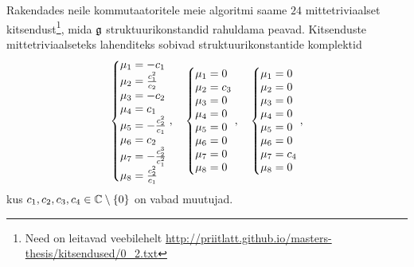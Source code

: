 Rakendades neile kommutaatoritele meie algoritmi saame $24$
mittetriviaalset kitsendust\footnote{Need on leitavad veebilehelt
\url{http://priitlatt.github.io/masters-thesis/kitsendused/0_2.txt}},
mida $\mathfrak{g}$ struktuurikonstandid rahuldama peavad. Kitsenduste
mittetriviaalseteks lahenditeks sobivad struktuurikonstantide komplektid
\renewcommand\arraystretch{1.3}
\begin{align*}
    \left\{ \begin{matrix*}[l]
        \m_1 = -c_1 \\
        \m_2 = \frac{c_1^2}{c_2} \\
        \m_3 = -c_2 \\
        \m_4 = c_1 \\
        \m_5 = -\frac{c_2^2}{c_1} \\
        \m_6 = c_2 \\
        \m_7 = -\frac{c_2^3}{c_1^2} \\
        \m_8 = \frac{c_2^2}{c_1} \\
    \end{matrix*} \right.,
    \quad
    \left\{ \begin{matrix*}[l]
        \m_1 = 0 \\
        \m_2 = c_3 \\
        \m_3 = 0 \\
        \m_4 = 0 \\
        \m_5 = 0 \\
        \m_6 = 0 \\
        \m_7 = 0 \\
        \m_8 = 0 \\
    \end{matrix*} \right.,
    \quad
    \left\{ \begin{matrix*}[l]
        \m_1 = 0 \\
        \m_2 = 0 \\
        \m_3 = 0 \\
        \m_4 = 0 \\
        \m_5 = 0 \\
        \m_6 = 0 \\
        \m_7 = c_4 \\
        \m_8 = 0 \\
    \end{matrix*} \right.,
\end{align*}
\renewcommand\arraystretch{1}
kus $c_1, c_2, c_3, c_4 \in \mathbb{C} \setminus \{0\}$ on vabad muutujad.

